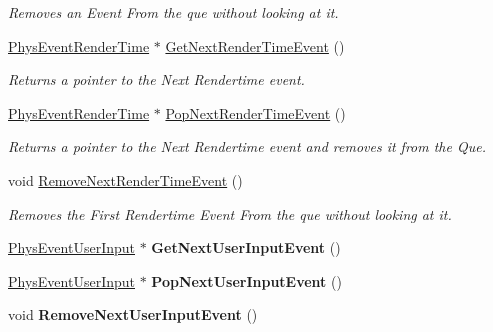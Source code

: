 \begin{DoxyCompactItemize}
\begin{DoxyCompactList}\small\item\em Removes an Event From the que without looking at it. \item\end{DoxyCompactList}\item 
\hyperlink{classPhysEventRenderTime}{PhysEventRenderTime} $\ast$ \hyperlink{classPhysEventManager_a1f2d0506ce816176913e5bdfaa9fd724}{GetNextRenderTimeEvent} ()
\begin{DoxyCompactList}\small\item\em Returns a pointer to the Next Rendertime event. \item\end{DoxyCompactList}\item 
\hyperlink{classPhysEventRenderTime}{PhysEventRenderTime} $\ast$ \hyperlink{classPhysEventManager_ad627925363fdbcff98e0faef204e81e2}{PopNextRenderTimeEvent} ()
\begin{DoxyCompactList}\small\item\em Returns a pointer to the Next Rendertime event and removes it from the Que. \item\end{DoxyCompactList}\item 
void \hyperlink{classPhysEventManager_a56acc075e743921e27284c023b3298ce}{RemoveNextRenderTimeEvent} ()
\begin{DoxyCompactList}\small\item\em Removes the First Rendertime Event From the que without looking at it. \item\end{DoxyCompactList}\item 
\hypertarget{classPhysEventManager_a4874a9b1138d2351bf28e527a66c02b8}{
\hyperlink{classPhysEventUserInput}{PhysEventUserInput} $\ast$ {\bfseries GetNextUserInputEvent} ()}
\label{d5/dd7/classPhysEventManager_a4874a9b1138d2351bf28e527a66c02b8}

\item 
\hypertarget{classPhysEventManager_ad6612a6e1c728941e2c467e7f136ca51}{
\hyperlink{classPhysEventUserInput}{PhysEventUserInput} $\ast$ {\bfseries PopNextUserInputEvent} ()}
\label{d5/dd7/classPhysEventManager_ad6612a6e1c728941e2c467e7f136ca51}

\item 
\hypertarget{classPhysEventManager_a9c6f5296c9961fa469ebe06d7599283a}{
void {\bfseries RemoveNextUserInputEvent} ()}
\label{d5/dd7/classPhysEventManager_a9c6f5296c9961fa469ebe06d7599283a}


\end{DoxyCompactItemize}
